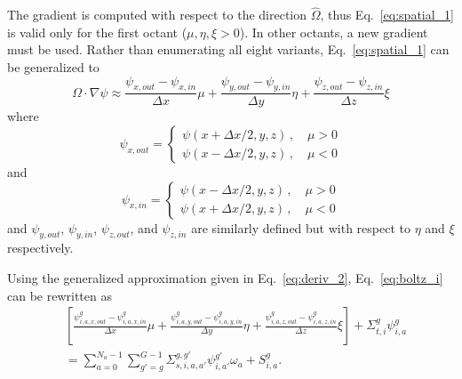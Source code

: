 The gradient is computed with respect to the direction $\hat{\Omega}$, thus Eq.~\ref{eq:spatial_1} is valid only for the first octant ($\mu, \eta, \xi > 0$). In other octants, a new gradient must be used. Rather than enumerating all eight variants, Eq.~\ref{eq:spatial_1} can be generalized to
\begin{equation} \label{eq:deriv_2}
\Omega \cdot \nabla \psi \approx 
\frac{\psi_{x,out} - \psi_{x,in}}{\Delta x} \mu + 
\frac{\psi_{y,out} - \psi_{y,in}}{\Delta y} \eta + 
\frac{\psi_{z,out} - \psi_{z,in}}{\Delta z} \xi
\end{equation}
where
\begin{equation}
\psi_{x,out} = 
\begin{cases}
\psi(x+\Delta x/2, y, z) \,, \quad \mu > 0 \\
\psi(x-\Delta x/2, y, z) \,, \quad \mu < 0
\end{cases}
\end{equation}
and
\begin{equation}
\psi_{x,in} = 
\begin{cases}
\psi(x-\Delta x/2, y, z) \,, \quad \mu > 0 \\
\psi(x+\Delta x/2, y, z) \,, \quad \mu < 0
\end{cases}
\end{equation}
and $\psi_{y,out}$, $\psi_{y,in}$, $\psi_{z,out}$, and $\psi_{z,in}$ are similarly defined but with respect to $\eta$ and $\xi$ respectively.


Using the generalized approximation given in Eq.~\ref{eq:deriv_2}, Eq.~\ref{eq:boltz_i} can be rewritten as
\begin{equation} \label{eq:boltz_i2}
\begin{split}
&\left[ 
\frac{\psi_{i,a,x,out}^g - \psi_{i,a,x,in}^g}{\Delta x} \mu + 
\frac{\psi_{i,a,y,out}^g - \psi_{i,a,y,in}^g}{\Delta y} \eta + 
\frac{\psi_{i,a,z,out}^g - \psi_{i,a,z,in}^g}{\Delta z} \xi
\right]
+ \Sigma_{t,i}^g \psi_{i,a}^{g} \\
& = 
\sum_{a=0}^{N_a-1} \sum_{g'=g}^{G-1} \Sigma_{s, i, a, a'}^{g, g'} \psi_{i, a'}^{g'} \omega_a + S_{i,a}^g.
\end{split}
\end{equation}

